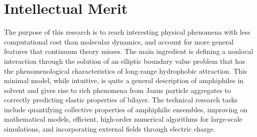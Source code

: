 %
%

\section{Intellectual Merit}
The purpose of this research is to reach interesting physical phenomena with less computational cost than molecular dynamics, and account for more general features that continuum theory misses. The main ingredient is defining a nonlocal interaction through the solution of an elliptic boundary value problem that has the phenomenological characteristics of long-range hydrophobic attraction. This minimal model, while intuitive, is quite a general description of amphiphiles in solvent and gives rise to rich phenomena from Janus particle aggregates to correctly predicting elastic properties of bilayer. The technical research tasks include quantifying collective properties of amphiphilic ensembles, improving on mathematical models, efficient, high-order numerical algorithms for large-scale simulations, and incorporating external fields through electric charge.

